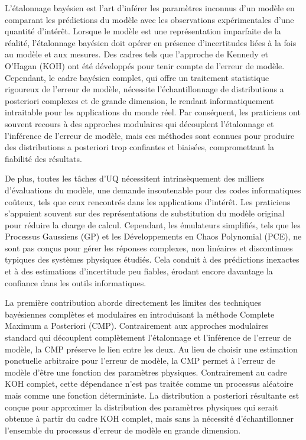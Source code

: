 \smallskip
L'\'etalonnage bay\'esien est l'art d'inf\'erer les param\`etres inconnus d'un mod\`ele en comparant les pr\'edictions du mod\`ele avec les observations exp\'erimentales d'une quantit\'e d'int\'er\^et. Lorsque le mod\`ele est une repr\'esentation imparfaite de la r\'ealit\'e, l'\'etalonnage bay\'esien doit op\'erer en pr\'esence d'incertitudes li\'ees \`a la fois au mod\`ele et aux mesures. Des cadres tels que l'approche de Kennedy et O'Hagan (KOH) ont \'et\'e d\'evelopp\'es pour tenir compte de l'erreur de mod\`ele. Cependant, le cadre bay\'esien complet, qui offre un traitement statistique rigoureux de l'erreur de mod\`ele, n\'ecessite l'\'echantillonnage de distributions a posteriori complexes et de grande dimension, le rendant informatiquement intraitable pour les applications du monde r\'eel. Par cons\'equent, les praticiens ont souvent recours \`a des approches modulaires qui d\'ecouplent l'\'etalonnage et l'inf\'erence de l'erreur de mod\`ele, mais ces m\'ethodes sont connues pour produire des distributions a posteriori trop confiantes et biais\'ees, compromettant la fiabilit\'e des r\'esultats.

\smallskip
De plus, toutes les t\^aches d'UQ n\'ecessitent intrins\`equement des milliers d'\'evaluations du mod\`ele, une demande insoutenable pour des codes informatiques co\^uteux, tels que ceux rencontr\'es dans les applications d'int\'er\^et. Les praticiens s'appuient souvent sur des repr\'esentations de substitution du mod\`ele original pour r\'eduire la charge de calcul. Cependant, les \'emulateurs simplifi\'es, tels que les Processus Gaussiens (GP) et les D\'eveloppements en Chaos Polynomial (PCE), ne sont pas con\c{c}us pour g\'erer les r\'eponses complexes, non lin\'eaires et discontinues typiques des syst\`emes physiques \'etudi\'es. Cela conduit \`a des pr\'edictions inexactes et \`a des estimations d'incertitude peu fiables, \'erodant encore davantage la confiance dans les outils informatiques.

\smallskip
La premi\`ere contribution aborde directement les limites des techniques bay\'esiennes compl\`etes et modulaires en introduisant la m\'ethode Complete Maximum a Posteriori (CMP). Contrairement aux approches modulaires standard qui d\'ecouplent compl\`etement l'\'etalonnage et l'inf\'erence de l'erreur de mod\`ele, la CMP pr\'eserve le lien entre les deux.
Au lieu de choisir une estimation ponctuelle arbitraire pour l'erreur de mod\`ele, la CMP permet \`a l'erreur de mod\`ele d'\^etre une fonction des param\`etres physiques. Contrairement au cadre KOH complet, cette d\'ependance n'est pas trait\'ee comme un processus al\'eatoire mais comme une fonction d\'eterministe.
La distribution a posteriori r\'esultante est con\c{c}ue pour approximer la distribution des param\`etres physiques qui serait obtenue \`a partir du cadre KOH complet, mais sans la n\'ecessit\'e d'\'echantillonner l'ensemble du processus d'erreur de mod\`ele en grande dimension.

